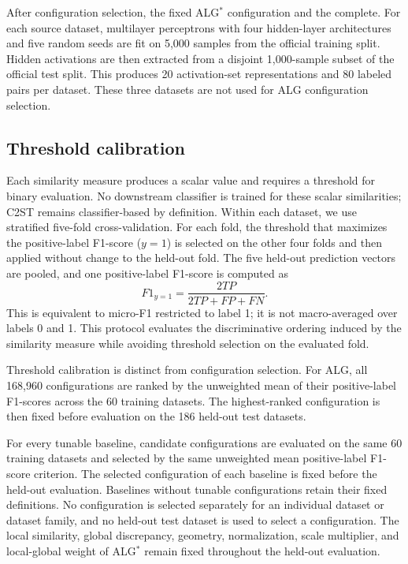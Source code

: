 \documentclass[preprint,12pt]{elsarticle}
\begin{document}
After configuration selection, the fixed ALG$^*$ configuration and the complete. For each source dataset, multilayer
perceptrons with four hidden-layer architectures and five random seeds are fit
on 5,000 samples from the official training split. Hidden activations are then
extracted from a disjoint 1,000-sample subset of the official test split. This
produces 20 activation-set representations and 80 labeled pairs per dataset.
These three datasets are not used for ALG configuration selection.

\subsection{Threshold calibration}

Each similarity measure produces a scalar value and requires a threshold for
binary evaluation. No downstream classifier is trained for these scalar
similarities; C2ST remains classifier-based by definition. Within each dataset, we use
stratified five-fold cross-validation. For each fold, the threshold that
maximizes the positive-label F1-score ($y=1$) is selected on the other four
folds and then applied without change to the held-out fold. The five held-out
prediction vectors are pooled, and one positive-label F1-score is computed as
\begin{equation}
F1_{y=1}=\frac{2TP}{2TP+FP+FN}.
\label{eq:positive-f1}
\end{equation}
This is equivalent to micro-F1 restricted to label 1; it is not macro-averaged
over labels 0 and 1. This protocol evaluates the discriminative
ordering induced by the similarity measure while avoiding threshold selection
on the evaluated fold.

Threshold calibration is distinct from configuration selection. For ALG,
all 168,960 configurations are ranked by the unweighted mean of their
positive-label F1-scores across the 60 training datasets. The highest-ranked
configuration is then fixed before evaluation on the 186 held-out test datasets.

For every tunable baseline, candidate configurations are evaluated on the
same 60 training datasets and selected by the same unweighted mean
positive-label F1-score criterion. The selected configuration of each baseline
is fixed before the held-out evaluation. Baselines without tunable
configurations retain their fixed definitions. No configuration is selected
separately for an individual dataset or dataset family, and no held-out test
dataset is used to select a configuration. The local similarity, global
discrepancy, geometry, normalization, scale multiplier, and local-global
weight of ALG$^*$ remain fixed throughout the held-out evaluation.
\end{document}
